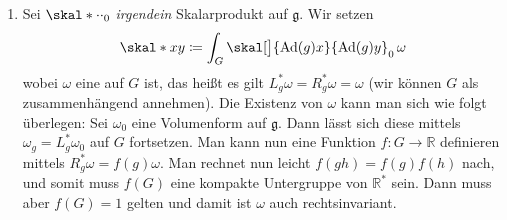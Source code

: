\begin{beweis}
	\begin{enumerate}[1)]
		\item Sei $\skal*{\cdot}{\cdot}_0$ \emph{irgendein} Skalarprodukt auf $\mathfrak{g}$.
		Wir setzen 
		\[
			\skal*{x}{y} \coloneqq \int_G \skal[\big]{\Ad(g)x}{\Ad(g)y}_0 \,\omega
		\]
		wobei $\omega$ eine  auf $G$ ist, das heißt es gilt $L^*_g \omega = R^*_g \omega= \omega$ (wir können $G$ als zusammenhängend annehmen). 
		Die Existenz von $\omega$ kann man sich wie folgt überlegen:
		Sei $\omega_0$ eine Volumenform auf $\mathfrak{g}$.
		Dann lässt sich diese mittels $\omega_g = L_g^* \omega_0$ auf $G$ fortsetzen.
		Man kann nun eine Funktion $f \colon G \to \mathbb{R}$ definieren mittels $R_g^* \omega = f(g) \omega$.
		Man rechnet nun leicht $f(gh) =f(g) f(h)$ nach, und somit muss $f(G)$ eine kompakte Untergruppe von $\mathbb{R}^*$ sein.
		Dann muss aber $f(G)=1$ gelten und damit ist $\omega$ auch rechtsinvariant.
		

\end{enumerate}
\end{beweis}
